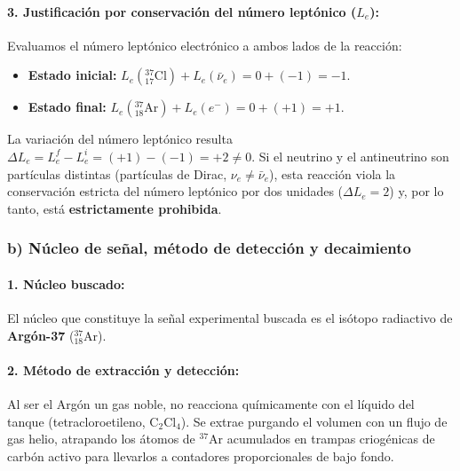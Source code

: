 \begin{problema}
\paragraph{3. Justificación por conservación del número leptónico ($L_e$):}
Evaluamos el número leptónico electrónico a ambos lados de la reacción:
\begin{itemize}
    \item \textbf{Estado inicial:} $L_e({}^{37}_{17}\text{Cl}) + L_e(\bar{\nu}_e) = 0 + (-1) = -1$.
    \item \textbf{Estado final:} $L_e({}^{37}_{18}\text{Ar}) + L_e(e^-) = 0 + (+1) = +1$.
\end{itemize}
La variación del número leptónico resulta $\Delta L_e = L_e^f - L_e^i = (+1) - (-1) = +2 \neq 0$. Si el neutrino y el antineutrino son partículas distintas (partículas de Dirac, $\nu_e \neq \bar{\nu}_e$), esta reacción viola la conservación estricta del número leptónico por dos unidades ($\Delta L_e = 2$) y, por lo tanto, está \textbf{estrictamente prohibida}.

\subsubsection*{b) Núcleo de señal, método de detección y decaimiento}

\paragraph{1. Núcleo buscado:}
El núcleo que constituye la señal experimental buscada es el isótopo radiactivo de \textbf{Argón-37} (${}^{37}_{18}\text{Ar}$).

\paragraph{2. Método de extracción y detección:}
Al ser el Argón un gas noble, no reacciona químicamente con el líquido del tanque (tetracloroetileno, $\text{C}_2\text{Cl}_4$). Se extrae purgando el volumen con un flujo de gas helio, atrapando los átomos de ${}^{37}\text{Ar}$ acumulados en trampas criogénicas de carbón activo para llevarlos a contadores proporcionales de bajo fondo.


\end{problema}
